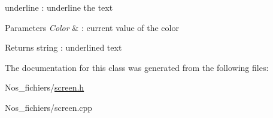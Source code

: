 underline \+: underline the text 


\begin{DoxyParams}{Parameters}
{\em Color} & \+: current value of the color \\
\hline
\end{DoxyParams}
\begin{DoxyReturn}{Returns}
string \+: underlined text 
\end{DoxyReturn}


The documentation for this class was generated from the following files\+:\begin{DoxyCompactItemize}
\item 
Nos\+\_\+fichiers/\hyperlink{screen_8h}{screen.\+h}\item 
Nos\+\_\+fichiers/screen.\+cpp\end{DoxyCompactItemize}

